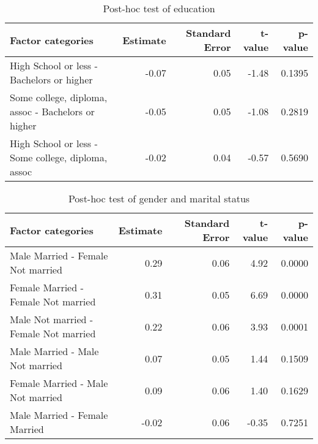 \begin{table}[H]
\footnotesize
\centering
\begin{tabular}{lrrrr}
  \hline
  Factor categories & Estimate & Standard Error & t-value & p-value \\ 
  \hline
   High School or less - Bachelors or higher & -0.07 & 0.05 & -1.48 & 0.1395 \\ 
   Some college, diploma, assoc - Bachelors or higher & -0.05 & 0.05 & -1.08 & 0.2819 \\ 
   High School or less - Some college, diploma, assoc & -0.02 & 0.04 & -0.57 & 0.5690 \\ 
  \hline
\end{tabular}
\caption{Post-hoc test of education} 
\label{tab:DisabEducation}
\end{table}

\begin{table}[H]
\footnotesize
\centering
\begin{tabular}{lrrrr}
  \hline
  Factor categories & Estimate & Standard Error & t-value & p-value \\ 
  \hline
    Male Married -  Female Not married & 0.29 & 0.06 & 4.92 & 0.0000 \\ 
    Female Married -  Female Not married & 0.31 & 0.05 & 6.69 & 0.0000 \\ 
    Male Not married -  Female Not married & 0.22 & 0.06 & 3.93 & 0.0001 \\ 
    Male Married -  Male Not married & 0.07 & 0.05 & 1.44 & 0.1509 \\ 
    Female Married -  Male Not married & 0.09 & 0.06 & 1.40 & 0.1629 \\ 
    Male Married -  Female Married & -0.02 & 0.06 & -0.35 & 0.7251 \\ 
  \hline
\end{tabular}
\caption{Post-hoc test of gender and marital status} 
\label{tab:DisabGenderMS}
\end{table}

